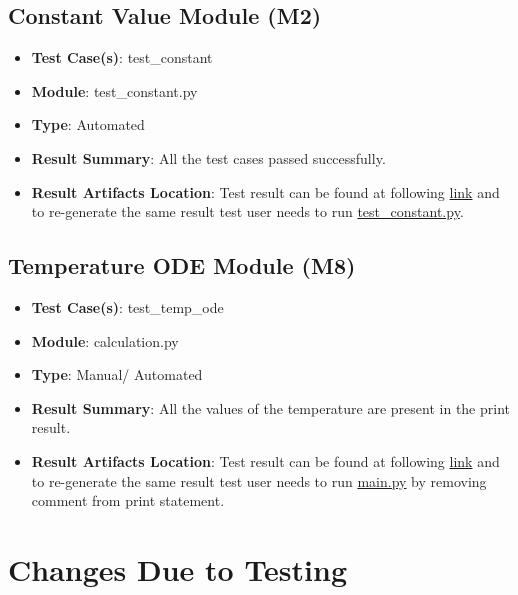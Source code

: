 \documentclass[12pt, titlepage]{article}
\begin{document}
\subsection{Constant Value Module (M2)} 
\begin{itemize}
    \item \textbf{Test Case(s)}: test\_constant
    \item \textbf{Module}: test\_constant.py
    \item \textbf{Type}: Automated 
    \item \textbf{Result Summary}: All the test cases passed successfully. 
    \item \textbf{Result Artifacts Location}: Test result can be found at following \href{https://github.com/DeeshaPatel/CAS-741-Solar-Cooker/blob/9a7ae69a1b005561bb8ac5d16c9275f5805ed72f/test/Unit%20test/result_constant.log}{link} and to re-generate the same result test user needs to run \href{https://github.com/DeeshaPatel/CAS-741-Solar-Cooker/blob/aa683cc4b92f631607346b8ae28d9ff73b78d420/src/testing/test_constant.py}{test\_constant.py}.  
\end{itemize}

\subsection{Temperature ODE Module (M8)} 
\begin{itemize}
    \item \textbf{Test Case(s)}: test\_temp\_ode
    \item \textbf{Module}: calculation.py
    \item \textbf{Type}: Manual/ Automated 
    \item \textbf{Result Summary}: All the values of the temperature are present in the print result. 
    \item \textbf{Result Artifacts Location}: Test result can be found at following \href{https://github.com/DeeshaPatel/CAS-741-Solar-Cooker/blob/9a7ae69a1b005561bb8ac5d16c9275f5805ed72f/test/Unit%20test/result_temperature.log}{link} and to re-generate the same result test user needs to run \href{https://github.com/DeeshaPatel/CAS-741-Solar-Cooker/blob/aa683cc4b92f631607346b8ae28d9ff73b78d420/src/src/main.py}{main.py} by removing comment from print statement.   
\end{itemize}


\section{Changes Due to Testing}
\end{document}

